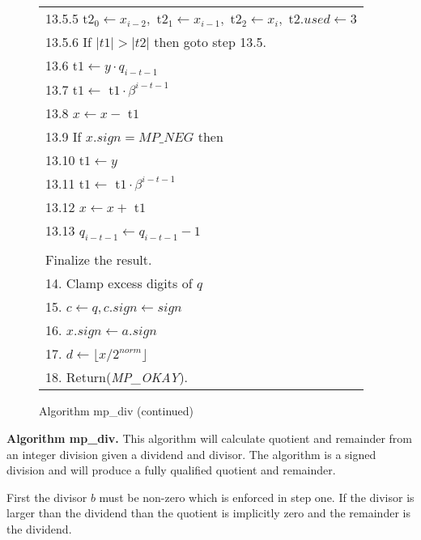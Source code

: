 \documentclass[b5paper]{book}
\begin{document}
\begin{figure}[!here]
\begin{small}
\begin{center}
\begin{tabular}{l}
\hspace{6mm}13.5.5  t$2_0 \leftarrow x_{i - 2}, $ t$2_1 \leftarrow x_{i - 1}, $ t$2_2 \leftarrow x_i, $ t$2.used \leftarrow 3$ \\
\hspace{6mm}13.5.6  If $\vert t1 \vert > \vert t2 \vert$ then goto step 13.5. \\
\hspace{3mm}13.6  t$1 \leftarrow y \cdot q_{i - t - 1}$ \\
\hspace{3mm}13.7  t$1 \leftarrow $ t$1 \cdot \beta^{i - t - 1}$ \\
\hspace{3mm}13.8  $x \leftarrow x - $ t$1$ \\
\hspace{3mm}13.9  If $x.sign = MP\_NEG$ then \\
\hspace{6mm}13.10  t$1 \leftarrow y$ \\
\hspace{6mm}13.11  t$1 \leftarrow $ t$1 \cdot \beta^{i - t - 1}$ \\
\hspace{6mm}13.12  $x \leftarrow x + $ t$1$ \\
\hspace{6mm}13.13  $q_{i - t - 1} \leftarrow q_{i - t - 1} - 1$ \\
\\
Finalize the result. \\
14.  Clamp excess digits of $q$ \\
15.  $c \leftarrow q, c.sign \leftarrow sign$ \\
16.  $x.sign \leftarrow a.sign$ \\
17.  $d \leftarrow \lfloor x / 2^{norm} \rfloor$ \\
18.  Return(\textit{MP\_OKAY}). \\
\hline
\end{tabular}
\end{center}
\end{small}
\caption{Algorithm mp\_div (continued)}
\end{figure}
\textbf{Algorithm mp\_div.}
This algorithm will calculate quotient and remainder from an integer division given a dividend and divisor.  The algorithm is a signed
division and will produce a fully qualified quotient and remainder.

First the divisor $b$ must be non-zero which is enforced in step one.  If the divisor is larger than the dividend than the quotient is implicitly 
zero and the remainder is the dividend.  
\end{document}
